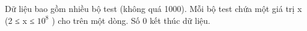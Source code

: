 Dữ liệu bao gồm nhiều bộ test (không quá 1000). Mỗi bộ test chứa một giá trị x (2 ≤ x ≤ $10^{8}$   ) cho trên một dòng. Số 0 kết thúc dữ liệu.